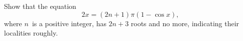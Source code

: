Show that the equation
\[
2x = (2n + 1)\pi(1 - \cos x),
\]
where $n$~is a positive integer, has $2n + 3$ roots and no more, indicating
their localities roughly. 

